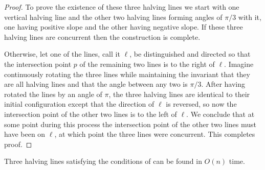 \documentclass[lotsofwhite]{patmorin}
\begin{document}
\begin{proof}
To prove the existence of these three halving lines we start with one
vertical halving line and the other two halving lines forming angles
of $\pi/3$ with it, one having positive slope and the other
having negative slope.  If these three halving lines are concurrent
then the construction is complete. 

Otherwise, let one of the lines, call it $\ell$, be distinguished and
directed so that the intersection point $p$ of the remaining two lines
is to the right of $\ell$.  Imagine continuously rotating the three
lines while maintaining the invariant that they are all halving lines
and that the angle between any two is $\pi/3$.  After having rotated
the lines by an angle of $\pi$, the three halving lines are identical
to their initial configuration except that the direction of $\ell$ is
reversed, so now the intersection point of the other two lines is to
the left of $\ell$.  We conclude that at some point during this
process the intersection point of the other two lines must have been
on $\ell$, at which point the three lines were concurrent.  This
completes proof.  
\end{proof}

\begin{lem}
Three halving lines satisfying the conditions of 
can be found in $O(n)$ time.
\end{lem}
\end{document}
